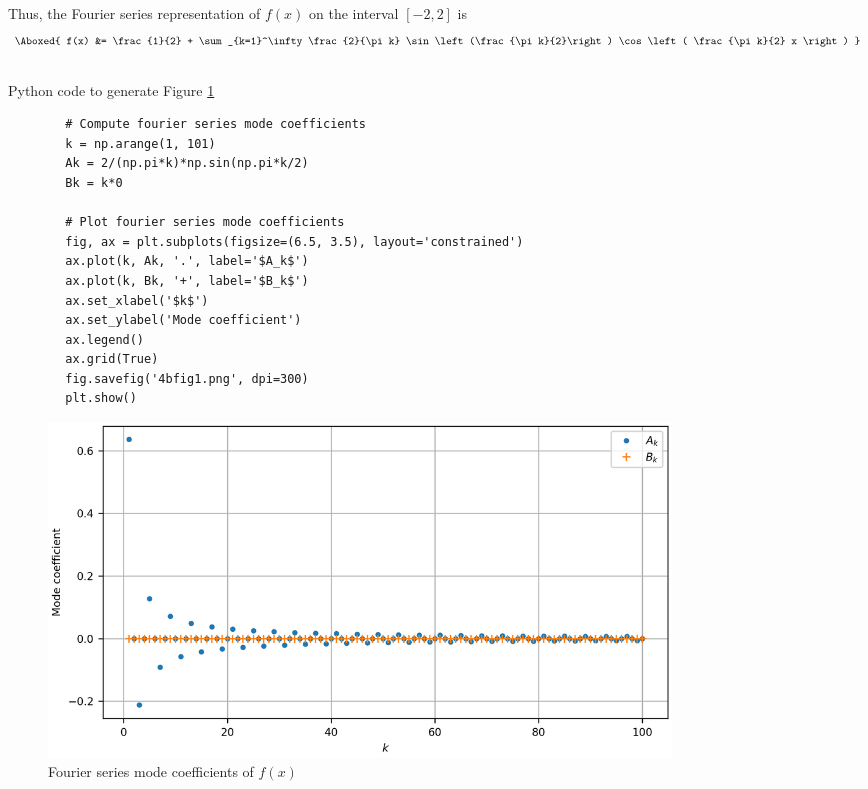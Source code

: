\documentclass[11pt]{article}
\begin{document}
Thus, the Fourier series representation of $f(x)$ on the interval $[-2, 2]$ is
\begin{align*}
    \Aboxed{
        f(x) &= \frac{1}{2} + \sum_{k=1}^\infty
        \frac{2}{\pi k} \sin\left(\frac{\pi k}{2}\right)
        \cos\left( \frac{\pi k}{2} x \right)
    }
\end{align*}

\subsection{} %
\begin{listing}[H]
    \caption{Python code to generate Figure \ref{4bfig1}}
    \label{4blst1}
    \begin{verbatim}
        # Compute fourier series mode coefficients
        k = np.arange(1, 101)
        Ak = 2/(np.pi*k)*np.sin(np.pi*k/2)
        Bk = k*0

        # Plot fourier series mode coefficients
        fig, ax = plt.subplots(figsize=(6.5, 3.5), layout='constrained')
        ax.plot(k, Ak, '.', label='$A_k$')
        ax.plot(k, Bk, '+', label='$B_k$')
        ax.set_xlabel('$k$')
        ax.set_ylabel('Mode coefficient')
        ax.legend()
        ax.grid(True)
        fig.savefig('4bfig1.png', dpi=300)
        plt.show()
    \end{verbatim}
\end{listing}

\begin{figure}[H]
    \centering
    \includegraphics[width=6.5in]{4bfig1.png}
    \caption{Fourier series mode coefficients of $f(x)$}
    \label{4bfig1}
\end{figure}
\end{document}
